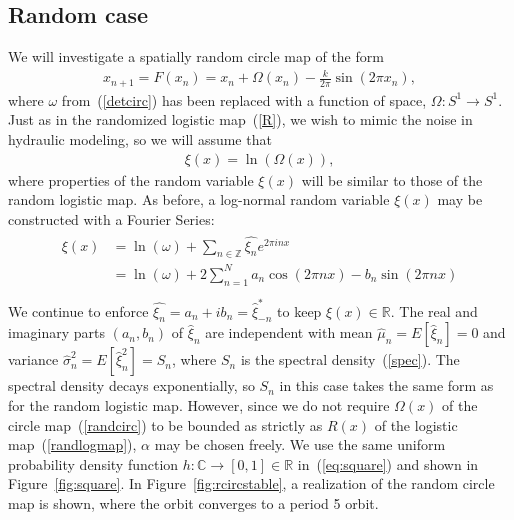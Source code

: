\subsection{Random case}
We will investigate a spatially random circle map of the form
\begin{align}\label{randcirc}
x_{n+1}= F(x_n) =  x_n + \Omega(x_n) - \frac{k}{2\pi}\sin(2\pi x_n),
\end{align}
where $\omega$ from~(\ref{detcirc}) has been replaced with a function
of space, $\Omega:S^1\to S^1$. Just as in the randomized logistic
map~(\ref{R}), we wish to mimic the noise in hydraulic modeling, so we
will assume that
\begin{align}\label{Omega}
\xi(x) = \ln(\Omega(x)),
\end{align}
where properties of the random variable $\xi(x)$ will be similar to those of the random logistic map. As before, a log-normal random variable $\xi(x)$ may be
constructed with a Fourier Series:
\begin{align}\label{fs_circ}
\begin{split}
\xi(x) &= \ln(\omega) + \sum_{n \in \mathbb{Z}}\hat{\xi_n}e^{2\pi inx}\\
&= \ln(\omega) + 2\sum^N_{n=1}a_n\cos(2\pi nx)-b_n\sin(2\pi nx)\\
\end{split}
\end{align}
We continue to enforce $\hat{\xi_n} = a_n + ib_n = \hat{\xi}_{-n}^*$
to keep $\xi(x) \in \mathbb{R}$. The real and imaginary parts
$(a_n,b_n)$ of $\hat{\xi}_n$ are independent with mean
$\hat{\mu}_n=E[\hat{\xi}_n]=0$ and variance $\hat{\sigma}_n^2=E[\hat{\xi}_n^2]=S_n$,
where $S_n$ is the spectral density~(\ref{spec}). The
spectral density decays exponentially, so $S_n$ in this case
takes the same form as for the random logistic map. However, since we
do not require $\Omega(x)$ of the circle map~(\ref{randcirc}) to be bounded as strictly
as $R(x)$ of the logistic map~(\ref{randlogmap}), $\alpha$ may be
chosen freely. We use the same uniform probability density
function $h:\mathbb{C}\to [0,1]\in \mathbb{R}$ in~(\ref{eq:square})
and shown in Figure~\ref{fig:square}. In Figure~\ref{fig:rcircstable}, a realization of the
random circle map is shown, where the orbit converges to a period 5 orbit.

